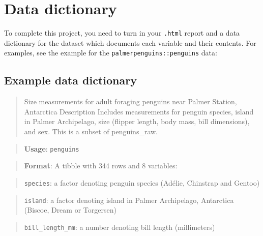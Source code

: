 \documentclass[letterpaper,9pt,twoside,]{pinp}
\begin{document}
\hypertarget{data-dictionary}{%
\section{Data dictionary}\label{data-dictionary}}

To complete this project, you need to turn in your \texttt{.html} report
and a data dictionary for the dataset which documents each variable and
their contents. For examples, see the example for the
\texttt{palmerpenguins::penguins} data:

\begin{Shaded}
\begin{Highlighting}[]
\SpecialCharTok{::}
\end{Highlighting}
\end{Shaded}

\hypertarget{example-data-dictionary}{%
\subsection{Example data dictionary}\label{example-data-dictionary}}

\begin{quote}
Size measurements for adult foraging penguins near Palmer Station,
Antarctica Description Includes measurements for penguin species, island
in Palmer Archipelago, size (flipper length, body mass, bill
dimensions), and sex. This is a subset of penguins\_raw.
\end{quote}

\begin{quote}
\textbf{Usage}: \texttt{penguins}
\end{quote}

\begin{quote}
\textbf{Format}: A tibble with 344 rows and 8 variables:
\end{quote}

\begin{quote}
\texttt{species}: a factor denoting penguin species (Adélie, Chinstrap
and Gentoo)
\end{quote}

\begin{quote}
\texttt{island}: a factor denoting island in Palmer Archipelago,
Antarctica (Biscoe, Dream or Torgersen)
\end{quote}

\begin{quote}
\texttt{bill\_length\_mm}: a number denoting bill length (millimeters)
\end{quote}
\end{document}
